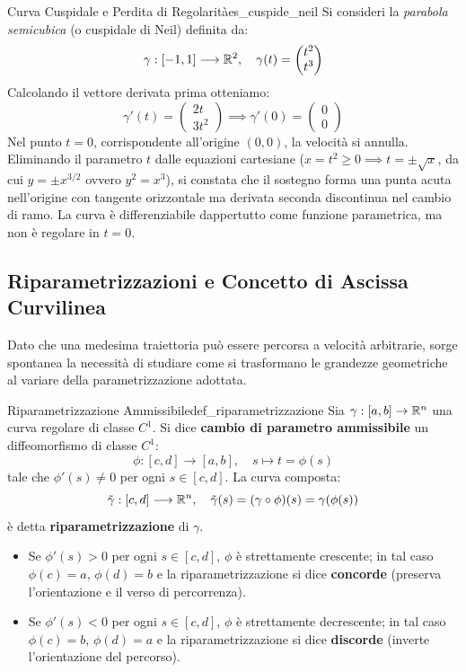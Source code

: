 \begin{esempio}{Curva Cuspidale e Perdita di Regolarità}{es_cuspide_neil}
Si consideri la \emph{parabola semicubica} (o cuspidale di Neil) definita da:
\[
\gamma: [-1, 1] \longrightarrow \mathbb{R}^2, \quad \gamma(t) = \begin{pmatrix} t^2 \\ t^3 \end{pmatrix}
\]
Calcolando il vettore derivata prima otteniamo:
\[
\gamma'(t) = \begin{pmatrix} 2t \\ 3t^2 \end{pmatrix} \implies \gamma'(0) = \begin{pmatrix} 0 \\ 0 \end{pmatrix}
\]
Nel punto $t=0$, corrispondente all'origine $(0,0)$, la velocità si annulla. Eliminando il parametro $t$ dalle equazioni cartesiane ($x = t^2 \ge 0 \implies t = \pm\sqrt{x}$, da cui $y = \pm x^{3/2}$ ovvero $y^2 = x^3$), si constata che il sostegno forma una punta acuta nell'origine con tangente orizzontale ma derivata seconda discontinua nel cambio di ramo. La curva è differenziabile dappertutto come funzione parametrica, ma non è regolare in $t=0$.
\end{esempio}

\subsection{Riparametrizzazioni e Concetto di Ascissa Curvilinea}

Dato che una medesima traiettoria può essere percorsa a velocità arbitrarie, sorge spontanea la necessità di studiare come si trasformano le grandezze geometriche al variare della parametrizzazione adottata.

\begin{definizione}{Riparametrizzazione Ammissibile}{def_riparametrizzazione}
Sia $\gamma: [a,b] \to \mathbb{R}^n$ una curva regolare di classe $C^1$. Si dice \textbf{cambio di parametro ammissibile} un diffeomorfismo di classe $C^1$:
\[
\phi: [c,d] \longrightarrow [a,b], \quad s \longmapsto t = \phi(s)
\]
tale che $\phi'(s) \neq 0$ per ogni $s \in [c,d]$. La curva composta:
\[
\tilde{\gamma}: [c,d] \longrightarrow \mathbb{R}^n, \quad \tilde{\gamma}(s) = (\gamma \circ \phi)(s) = \gamma(\phi(s))
\]
è detta \textbf{riparametrizzazione} di $\gamma$.
\begin{itemize}
    \item Se $\phi'(s) > 0$ per ogni $s \in [c,d]$, $\phi$ è strettamente crescente; in tal caso $\phi(c)=a$, $\phi(d)=b$ e la riparametrizzazione si dice \textbf{concorde} (preserva l'orientazione e il verso di percorrenza).
    \item Se $\phi'(s) < 0$ per ogni $s \in [c,d]$, $\phi$ è strettamente decrescente; in tal caso $\phi(c)=b$, $\phi(d)=a$ e la riparametrizzazione si dice \textbf{discorde} (inverte l'orientazione del percorso).
\end{itemize}
\end{definizione}

